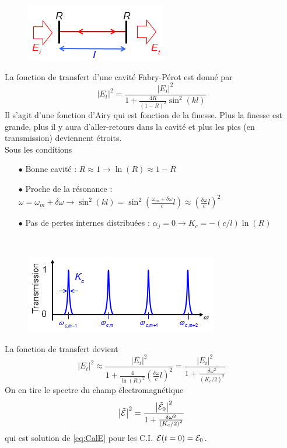 	\begin{figure}
	\vspace{-5mm}
	\includegraphics[scale=0.8]{ch3/image5.png}
	\end{figure}
La fonction de transfert d'une cavité Fabry-Pérot est donné par
\begin{equation}
{\left| {{E_t}} \right|^2} = \frac{{{{\left| {{E_i}} \right|}^2}}}{{1 + \frac{{4R}}{{{{(1 - R)}^2}}}{{\sin }^2}(kl)}}
\end{equation}
Il s'agit d'une fonction d'Airy qui est fonction de la finesse. Plus la finesse est grande, plus 
il y aura d'aller-retours dans la cavité et plus les pics (en transmission) deviennent étroits. \\

\newpage
Sous les conditions 
\begin{itemize}
\item[$\bullet$] Bonne cavité : $R\approx1\rightarrow \ln(R)\approx 1-R$
\item[$\bullet$] Proche de la résonance : $\omega=\omega_m+\delta\omega \rightarrow {\sin ^2}(kl) = {\sin ^2}(\frac{{{\omega _m} + \delta \omega }}{c}l) \approx {(\frac{{\delta \omega }}{c}l)^2}$
\item[$\bullet$] Pas de pertes internes distribuées : $\alpha_j=0\rightarrow {K_c} =  - (c/l)\ln (R)$
\end{itemize}\ 


	\begin{figure}
	\vspace{-5mm}
	\includegraphics[scale=0.8]{ch3/image6.png}
	\end{figure}
La fonction de transfert devient
\begin{equation}
{\left| {{E_t}} \right|^2} \approx \frac{{{{\left| {{E_i}} \right|}^2}}}{{1 + \frac{4}{{\ln {{(R)}^2}}}{{(\frac{{\delta \omega }}{c}l)}^2}}} = \frac{{{{\left| {{E_i}} \right|}^2}}}{{1 + \frac{{\delta {\omega ^2}}}{{{{({K_c}/2)}^2}}}}}
\end{equation}
On en tire le spectre du champ électromagnétique
\begin{equation}
{\left| {\tilde {\cal E}} \right|^2} = \frac{{{{\left| {{{\tilde {\cal E}}_0}} \right|}^2}}}{{1 + \frac{{\delta {\omega ^2}}}{{{{({K_c}/2)}^2}}}}}
\end{equation}
qui est solution de \eqref{eq:CalE} pour les C.I. ${{\cal E}}(t = 0) = {{{\cal E}}_0}$.



